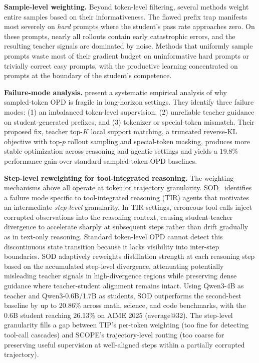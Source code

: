 \documentclass{article} %
\begin{document}
\textbf{Sample-level weighting.} Beyond token-level filtering, several methods weight entire samples based on their informativeness. The flawed prefix trap manifests most severely on \emph{hard} prompts where the student's pass rate approaches zero. On these prompts, nearly all rollouts contain early catastrophic errors, and the resulting teacher signals are dominated by noise. Methods that uniformly sample prompts waste most of their gradient budget on uninformative hard prompts or trivially correct easy prompts, with the productive learning concentrated on prompts at the boundary of the student's competence.

\textbf{Failure-mode analysis.} \citet{2603.25562} present a systematic empirical analysis of why sampled-token OPD is fragile in long-horizon settings. They identify three failure modes: (1) an imbalanced token-level supervision, (2) unreliable teacher guidance on student-generated prefixes, and (3) tokenizer or special-token mismatch. Their proposed fix, teacher top-$K$ local support matching, a truncated reverse-KL objective with top-$p$ rollout sampling and special-token masking, produces more stable optimization across reasoning and agentic settings and yields a 19.8\% performance gain over standard sampled-token OPD baselines.

\textbf{Step-level reweighting for tool-integrated reasoning.} The weighting mechanisms above all operate at token or trajectory granularity. SOD~\citep{2605.07725} identifies a failure mode specific to tool-integrated reasoning (TIR) agents that motivates an intermediate \emph{step-level} granularity. In TIR settings, erroneous tool calls inject corrupted observations into the reasoning context, causing student-teacher divergence to accelerate sharply at subsequent steps rather than drift gradually as in text-only reasoning. Standard token-level OPD cannot detect this discontinuous state transition because it lacks visibility into inter-step boundaries. SOD adaptively reweights distillation strength at each reasoning step based on the accumulated step-level divergence, attenuating potentially misleading teacher signals in high-divergence regions while preserving dense guidance where teacher-student alignment remains intact. Using Qwen3-4B as teacher and Qwen3-0.6B/1.7B as students, SOD outperforms the second-best baseline by up to 20.86\% across math, science, and code benchmarks, with the 0.6B student reaching 26.13\% on AIME 2025 (average@32). The step-level granularity fills a gap between TIP's per-token weighting (too fine for detecting tool-call cascades) and SCOPE's trajectory-level routing (too coarse for preserving useful supervision at well-aligned steps within a partially corrupted trajectory).
\end{document}
